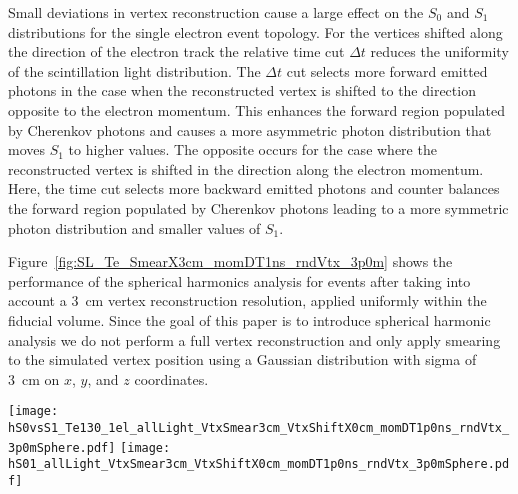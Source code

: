 Small deviations in vertex reconstruction cause a large effect
on the $S_0$ and $S_1$ distributions for the single electron event topology.
For the vertices shifted along the direction of the electron track the relative time cut $\Delta t$
reduces the uniformity of the scintillation light distribution. The
$\Delta t$ cut selects more forward emitted photons in the case when
the reconstructed vertex is shifted to the direction opposite to the
electron momentum. This enhances the forward region populated by Cherenkov
photons and causes a more asymmetric photon distribution that moves $S_1$ to higher values.  The opposite occurs for the case where the reconstructed vertex is shifted in the direction along the electron
momentum. Here, the time cut selects more backward emitted photons and counter balances the forward region populated by Cherenkov
photons leading to a more symmetric photon distribution and smaller values of $S_1$.

Figure~\ref{fig:SL_Te_SmearX3cm_momDT1ns_rndVtx_3p0m} shows the performance of the spherical harmonics analysis for events after taking into account a 3~cm vertex reconstruction resolution, applied uniformly within the fiducial volume. Since the goal of this paper is to introduce spherical harmonic analysis we do not perform a full vertex reconstruction and only apply smearing to the simulated vertex position using a Gaussian distribution with sigma of 3~cm on $x$, $y$, and $z$ coordinates. 

\begin{figure*}[h]
  \centering
  \texttt{[image: hS0vsS1\_Te130\_1el\_allLight\_VtxSmear3cm\_VtxShiftX0cm\_momDT1p0ns\_rndVtx\_3p0mSphere.pdf]}
  \texttt{[image: hS01\_allLight\_VtxSmear3cm\_VtxShiftX0cm\_momDT1p0ns\_rndVtx\_3p0mSphere.pdf]}
  \caption{Spherical harmonics comparison between $^{130}$Te 0{\nbb}
    decay signal ($Q=2.529$~MeV) (\emph{red}) and $^{8}$B solar
    neutrinos background (\emph{blue}) for 1000 simulated
    events.Verticies are uniformly distributed within the fiducial
    volume, R$<$3~m. $^8$Be events are implemented as 2.529~MeV
    electrons with the initial momentum direction uniformly
    distributed within 4$\pi$ solid angle. Vetrex is smeared with 3~cm
    resolution. \emph{Left:} $S_0$ versus $S_1$ scatter plot. Black
    dotted line is a linear fit of these 2D histograms. Variable
    $S_{01}$ is defined as a projection of 2D distribution onto this
    linear fit. \emph{Right:} $S_{01}$}
\label{fig:SL_Te_SmearX3cm_momDT1ns_rndVtx_3p0m}
\end{figure*}


